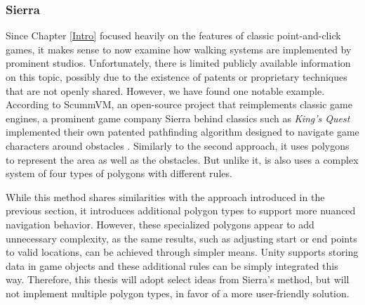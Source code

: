 \subsubsection{Sierra}
Since Chapter \ref{Intro} focused heavily on the features of classic point-and-click games, it makes sense to now examine how walking systems are implemented by prominent studios. Unfortunately, there is limited publicly available information on this topic, possibly due to the existence of patents or proprietary techniques that are not openly shared. However, we have found one notable example. According to ScummVM, an open-source project that reimplements classic game engines, a prominent game company Sierra behind classics such as \textit{King's Quest} implemented their own patented pathfinding algorithm designed to navigate game characters around obstacles \cite{ScummVM-polygons}. Similarly to the second approach, it uses polygons to represent the area as well as the obstacles. But unlike it, is also uses a complex system of four types of polygons with different rules. 

While this method shares similarities with the approach introduced in the previous section, it introduces additional polygon types to support more nuanced navigation behavior. However, these specialized polygons appear to add unnecessary complexity, as the same results, such as adjusting start or end points to valid locations, can be achieved through simpler means. Unity supports storing data in game objects and these additional rules can be simply integrated this way. Therefore, this thesis will adopt select ideas from Sierra’s method, but will not implement multiple polygon types, in favor of a more user-friendly solution. 

